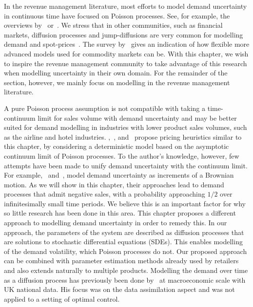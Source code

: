 \documentclass[main.tex]{subfiles}
\begin{document}
In the revenue management literature, most efforts to model demand uncertainty in
continuous time have focused on Poisson
processes. See, for example, the overviews by~\cite{bitran2003overview}
or~\cite{aviv2012dynamic}.
We stress that in other communities, such as financial markets,
diffusion processes and jump-diffusions are very common for modelling
demand and spot-prices~\citep{benth2014stochastic}. The survey by~\cite{carmona2014survey}
gives an indication of how flexible more advanced models used for commodity
markets can be. With this chapter, we wish to inspire the revenue
management community to take advantage of this research when modelling
uncertainty in their own domain. For the remainder of the section,
however, we mainly focus on modelling in the revenue management literature.

A pure Poisson process assumption is not compatible with taking a
time-continuum limit for sales volume with demand uncertainty and may
be better suited for demand
modelling in industries with lower product sales volumes, such as
the airline and hotel industries.
\cite{maglaras2006dynamic},~\cite{schlosser2015dynamic1},
and~\cite{schlosser2015dynamic2}
propose pricing heuristics similar to this
chapter, by considering a deterministic model based on the asymptotic continuum
limit of Poisson processes.
To the author's knowledge, however,
few attempts have been made to unify demand uncertainty with the continuum
limit. For example,~\cite{raman1995optimal} and~\cite{wu2016dynamic}, model
demand uncertainty as increments of a Brownian motion. As we will show
in this chapter, their approaches lead to demand processes that admit
negative sales, with a probability approaching $1/2$ over
infinitesimally small time periods. We believe this is an important
factor for why so little research has been done in this area.
This chapter proposes a different
approach to modelling demand uncertainty in order to remedy this.
In our approach, the parameters of the system are described
as diffusion processes that are solutions to
stochastic differential equations (SDEs).
This enables modelling of the demand volatility, which Poisson
processes do not.
Our proposed approach can be combined with parameter estimation
methods already used by retailers
and also extends naturally to multiple products.
Modelling the demand over time as a diffusion process has previously
been done by~\cite{chambers1992estimation} at macroeconomic scale
with UK national data. His focus was on the data assimilation aspect and was not
applied to a setting of optimal control.
\end{document}
